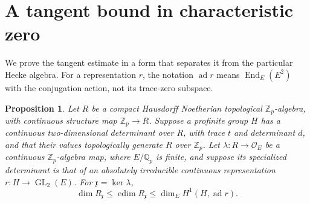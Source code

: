 \documentclass[11pt]{article}
\newtheorem{proposition}[theorem]{Proposition}
\theoremstyle{remark}
\numberwithin{equation}{section}
\newcommand{\Z}{\mathbb Z}
\newcommand{\Q}{\mathbb Q}
\newcommand{\OO}{\mathcal O}
\newcommand{\frakx}{\mathfrak x}
\DeclareMathOperator{\End}{End}
\DeclareMathOperator{\GL}{GL}
\DeclareMathOperator{\ad}{ad}
\DeclareMathOperator{\edim}{edim}
\begin{document}
\section{A tangent bound in characteristic zero}
\label{sec:tangent}

We prove the tangent estimate in a form that separates it from the
particular Hecke algebra. For a representation $r$, the notation
$\ad r$ means $\End_E(E^2)$ with the conjugation action, not its
trace-zero subspace.

\begin{proposition}\label{prop:tangent}
Let $R$ be a compact Hausdorff Noetherian topological
$\Z_p$-algebra, with continuous structure map $\Z_p\to R$.
Suppose a profinite
group $H$ has a continuous two-dimensional determinant over $R$,
with trace $t$ and determinant $d$, and that their values
topologically generate $R$ over $\Z_p$. Let
$\lambda:R\to\OO_E$ be a continuous $\Z_p$-algebra map, where
$E/\Q_p$ is finite, and suppose its specialized determinant is
that of an absolutely irreducible continuous representation
$r:H\to\GL_2(E)$. For $\frakx=\ker\lambda$,
\begin{equation}\label{eq:tangent-bound}
 \dim R_{\frakx}\leq\edim R_{\frakx}
 \leq\dim_E H^1(H,\ad r).
\end{equation}
\end{proposition}
\end{document}
